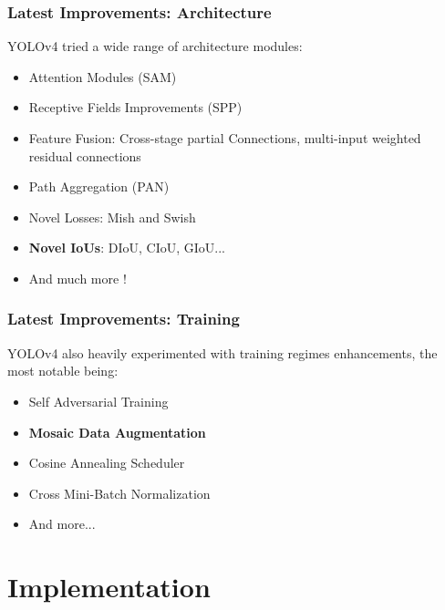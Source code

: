\documentclass[aspectratio=169]{beamer}
\begin{document}
	\begin{frame}
		\frametitle{Latest Improvements: Architecture} 

		YOLOv4\cite{yolov4} tried a wide range of architecture modules: 
		\begin{itemize}
			\item Attention Modules (SAM)\cite{sam}
			\item Receptive Fields Improvements (SPP)\cite{spp}
			\item Feature Fusion: Cross-stage partial Connections, multi-input weighted residual connections
			\item Path Aggregation (PAN)\cite{pan}
			\item Novel Losses: Mish\cite{mish} and Swish\cite{swish}
			\item \textbf{Novel IoUs}: DIoU\cite{diou}, CIoU\cite{diou}, GIoU\cite{giou}...  
			\item And much more ! 
		\end{itemize}
	\end{frame}

	\begin{frame}
		\frametitle{Latest Improvements: Training}
		YOLOv4 also heavily experimented with training regimes enhancements, the most notable being:
		\begin{itemize}
			\item Self Adversarial Training
			\item \textbf{Mosaic Data Augmentation}
			\item Cosine Annealing Scheduler
			\item Cross Mini-Batch Normalization
			\item And more...
		\end{itemize}
	\end{frame}

\section{Implementation}
\end{document}
